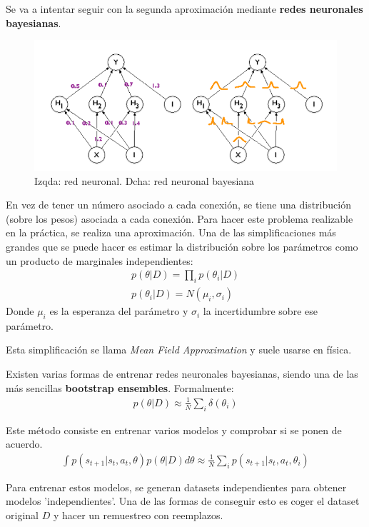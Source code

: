Se va a intentar seguir con la segunda aproximación mediante \textbf{redes neuronales
bayesianas}. 

\begin{figure}[H]
	\centering
	\includegraphics[width=0.8\linewidth]{figures/2020-06-27-180325_735x317_scrot.png}
	\caption{Izqda: red neuronal. Dcha: red neuronal bayesiana}
\end{figure}

En vez de tener un número asociado a cada conexión, se tiene una distribución (sobre
los pesos) asociada a cada conexión. Para hacer este problema realizable en la práctica, se
realiza una aproximación. Una de las simplificaciones más grandes que se puede hacer es
estimar la distribución sobre los parámetros como un producto de marginales independientes:
\begin{align}
p ( \theta | D ) = \prod _ { i } p ( \theta _ { i } | D )\\
p ( \theta _ { i } | D ) = N ( \mu _ { i } , \sigma _ { i } )
\end{align}
Donde $\mu_i$ es la esperanza del parámetro y  $\sigma_i$ la incertidumbre sobre ese parámetro.

Esta simplificación se llama \textit{Mean Field Approximation} y suele usarse en física.

Existen varias formas de entrenar redes neuronales bayesianas, siendo una de las más sencillas
\textbf{bootstrap ensembles}. Formalmente:
\begin{align}
p ( \theta | D ) \approx \frac { 1 } { N } \sum _ { i } \delta ( \theta _ { i } )
\end{align}

Este método consiste en entrenar varios modelos y comprobar
si se ponen de acuerdo.
\begin{align}
\int p ( s _ { t + 1 } | s _ { t } , a _ { t } , \theta ) p ( \theta | D ) d \theta \approx \frac { 1 } { N } \sum _ { i } p ( s _ { t + 1 } | s _ { t } , a _ { t } , \theta _ { i } )
\end{align}

Para entrenar estos modelos, se generan datasets independientes para obtener modelos
'independientes'. Una de las formas de conseguir esto es coger el dataset original $D$ y hacer
un remuestreo con reemplazos.


